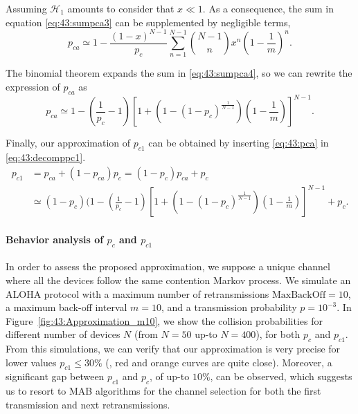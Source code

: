 Assuming $\mathcal{H}_{1}$ amounts to consider that $x\ll 1$. As a consequence, the sum in equation \eqref{eq:43:sumpca3} can be supplemented by negligible terms,
%
\begin{equation}\label{eq:43:sumpca4}
	p_{ca} \simeq  1 - \frac{\left(1-x\right)^{N-1}}{p_c}\sum_{n=1}^{N-1}{N-1 \choose n} x^n \left( 1-\frac{1}{m}\right)^n.
\end{equation}

The binomial theorem expands the sum in \eqref{eq:43:sumpca4}, so we can rewrite the expression of $p_{ca}$ as
%
\begin{equation}\label{eq:43:pca}
	p_{ca} \simeq 1 - \left(\frac{1}{p_c}-1\right)\left[ 1+\left(1-\left(1-p_c\right)^{\frac{1}{N-1}}\right)\left(1-\frac{1}{m}\right)\right]^{N-1}.
\end{equation}

Finally, our approximation of $p_{c1}$ can be obtained by inserting \eqref{eq:43:pca} in \eqref{eq:43:decomppc1}.
%
\begin{align}\label{eq:43:final_expression_pc1}
	p_{c1} &= p_{ca}+\left(1-p_{ca}\right)p_c = (1 - p_c) p_{ca} + p_c \nonumber \\
	&\simeq \left(1 - p_c\right) (1 - \left(\frac{1}{p_c}-1\right)\left[ 1+\left(1-\left(1-p_c\right)^{\frac{1}{N-1}}\right)\left(1-\frac{1}{m}\right)\right]^{N-1} + p_c.
\end{align}


\paragraph{Behavior analysis of $p_{c}$ and $p_{c1}$}\label{sub:43:numericalValidationPC1PC}

In order to assess the proposed approximation, we suppose a unique channel where all the devices follow the same contention Markov process.
We simulate an ALOHA protocol with a maximum number of retransmissions $\mathrm{MaxBackOff}=10$, a maximum back-off interval $m=10$, and a transmission probability $p=10^{-3}$.
%
In Figure~\ref{fig:43:Approximation_m10}, we show the collision probabilities for different number of devices $N$ (from $N=50$ up-to $N=400$), for both $p_{c}$ and $p_{c1}$.
%
From this simulations, we can verify that our approximation is very precise for lower values $p_{c1} \leq 30 \%$ (\ie, red and orange curves are quite close).
Moreover, a significant gap between $p_{c1}$ and $p_c$,
of up-to $10\%$, can be observed,
which suggests us to resort to MAB algorithms for the channel selection for both the first transmission and next retransmissions.


